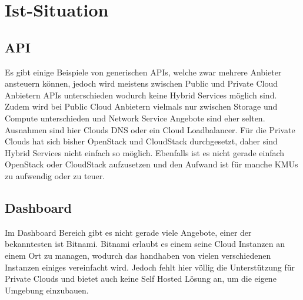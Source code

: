 \section{Ist-Situation}
\subsection{API}
Es gibt einige Beispiele von generischen APIs, welche zwar mehrere Anbieter 
ansteuern können, jedoch wird meistens zwischen Public und Private Cloud Anbietern APIs 
unterschieden wodurch keine Hybrid Services möglich sind.
Zudem wird bei Public Cloud Anbietern vielmals nur zwischen Storage und 
Compute unterschieden und Network Service Angebote sind eher selten.
Ausnahmen sind hier Clouds DNS oder ein Cloud Loadbalancer.
Für die Private Clouds hat sich bisher OpenStack und CloudStack durchgesetzt, 
daher sind Hybrid Services nicht einfach so möglich.
Ebenfalls ist es nicht gerade einfach OpenStack oder CloudStack
 aufzusetzen und den Aufwand ist für manche KMUs zu aufwendig oder zu teuer.



\subsection{Dashboard}

Im Dashboard Bereich gibt es nicht gerade viele Angebote, einer der bekanntesten ist Bitnami.
Bitnami erlaubt es einem seine Cloud Instanzen an einem Ort zu managen, wodurch 
das handhaben von vielen verschiedenen Instanzen einiges vereinfacht wird.
Jedoch fehlt hier völlig die Unterstützung für Private Clouds und bietet auch keine Self Hosted Lösung an, 
um die eigene Umgebung einzubauen.
